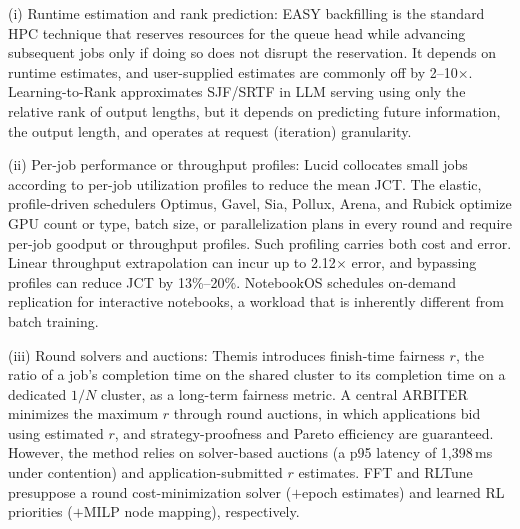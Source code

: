 \documentclass{ieeetj}
\begin{document}
(i) Runtime estimation and rank prediction: EASY backfilling\cite{mualem2001backfilling} is the standard HPC technique that reserves resources for the queue head while advancing subsequent jobs only if doing so does not disrupt the reservation. It depends on runtime estimates, and user-supplied estimates are commonly off by 2–10$\times$. Learning-to-Rank\cite{fu2024efficient} approximates SJF/SRTF in LLM serving using only the relative rank of output lengths, but it depends on predicting future information, the output length, and operates at request (iteration) granularity.

(ii) Per-job performance or throughput profiles: Lucid\cite{b5} collocates small jobs according to per-job utilization profiles to reduce the mean JCT. The elastic, profile-driven schedulers Optimus\cite{peng2018optimus}, Gavel\cite{narayanan2020gavel}, Sia\cite{b4}, Pollux\cite{qiao2021pollux}, Arena\cite{arena2026}, and Rubick\cite{rubick2025} optimize GPU count or type, batch size, or parallelization plans in every round and require per-job goodput or throughput profiles. Such profiling carries both cost and error. Linear throughput extrapolation can incur up to 2.12$\times$ error, and bypassing profiles can reduce JCT by 13\%--20\%\cite{schedmate2025}. NotebookOS\cite{notebookos2026} schedules on-demand replication for interactive notebooks, a workload that is inherently different from batch training.

(iii) Round solvers and auctions: Themis\cite{mahajan2020themis} introduces finish-time fairness $r$, the ratio of a job's completion time on the shared cluster to its completion time on a dedicated $1/N$ cluster, as a long-term fairness metric. A central ARBITER minimizes the maximum $r$ through round auctions, in which applications bid using estimated $r$, and strategy-proofness and Pareto efficiency are guaranteed. However, the method relies on solver-based auctions (a p95 latency of 1,398\,ms under contention) and application-submitted $r$ estimates. FFT\cite{fft2025} and RLTune\cite{rltune2025} presuppose a round cost-minimization solver ($+$epoch estimates) and learned RL priorities ($+$MILP node mapping), respectively.
\end{document}

